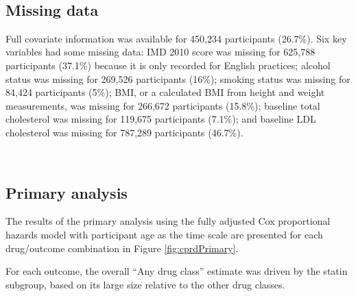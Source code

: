 \documentclass[a4paper, twoside]{templates/ociamthesis}
\begin{document}
~

\hypertarget{missing-data-1}{%
\subsection{Missing data}\label{missing-data-1}}

Full covariate information was available for 450,234 participants (26.7\%). Six key variables had some missing data: IMD 2010 score was missing for 625,788 participants (37.1\%) because it is only recorded for English practices; alcohol status was missing for 269,526 participants (16\%); smoking status was missing for 84,424 participants (5\%); BMI, or a calculated BMI from height and weight measurements, was missing for 266,672 participants (15.8\%); baseline total cholesterol was missing for 119,675 participants (7.1\%); and baseline LDL cholesterol was missing for 787,289 participants (46.7\%).

~

\hypertarget{primary-analysis}{%
\subsection{Primary analysis}\label{primary-analysis}}

The results of the primary analysis using the fully adjusted Cox proportional hazards model with participant age as the time scale are presented for each drug/outcome combination in Figure \ref{fig:cprdPrimary}.

For each outcome, the overall ``Any drug class'' estimate was driven by the statin subgroup, based on its large size relative to the other drug classes.

~
\end{document}
